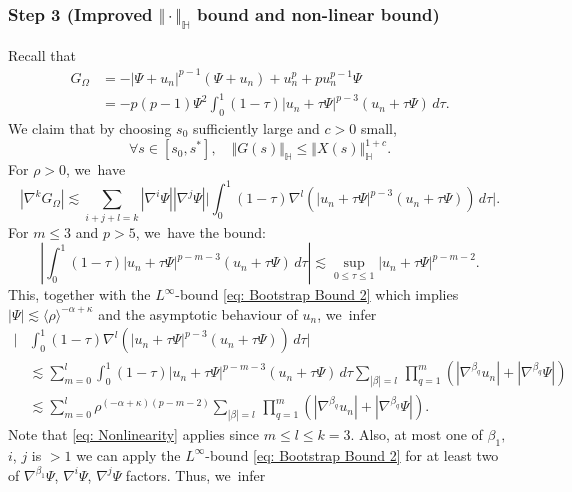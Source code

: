 \documentclass[JEP,XML,SOM,Unicode]{cedram}
\theoremstyle{plain}
\theoremstyle{definition}
\begin{document}
\subsubsection*{Step 3 (Improved $\Vert \cdot\Vert_{\mathbb H}$ bound and non-linear bound)}
Recall that
\begin{equation}
\label{eq: Integral Form of Nonlinearity}
\begin{aligned}
G_\Omega&=-|\Psi+u_n|^{p-1}(\Psi+u_n)+u_n^p+pu_n^{p-1}\Psi\\
&=-p(p-1)\Psi^2\int_0^1(1-\tau)|u_n+\tau\Psi|^{p-3}(u_n+\tau\Psi)\,d\tau.
\end{aligned}
\end{equation}
We claim that by choosing $s_0$ sufficiently large and $c>0$ small,
\begin{equation}
\label{eq: Nonlinear Bound 2}
\forall s\in [s_0,s^*],\quad \Vert G(s)\Vert_{\mathbb H}\le\Vert X(s)\Vert_{\mathbb H}^{1+c}.
\end{equation}
For $\rho>0$, we~have
\begin{equation}
\label{eq: Derivative Nonlinearity}
|\nabla^k G_\Omega|\lesssim \sum_{i+j+l=k}|\nabla^i\Psi||\nabla^j\Psi| \bigg|\int_0^1(1-\tau)\nabla^l\left(|u_n+\tau\Psi|^{p-3}(u_n+\tau\Psi)\right)\,d\tau\bigg|.
\end{equation}
For $m\le 3$ and $p>5$, we~have the bound:
\begin{equation}
\label{eq: Nonlinearity}
\left|\int_0^1(1-\tau)|u_n+\tau\Psi|^{p-m-3}(u_n+\tau\Psi)\,d\tau\right|\lesssim \sup_{0\le\tau\le1}|u_n+\tau\Psi|^{p-m-2}.
\end{equation}
This, together with the $L^\infty$-bound \eqref{eq: Bootstrap Bound 2} which implies $|\Psi|\lesssim \langle\rho\rangle^{-\alpha+\kappa}$ and the asymptotic behaviour of $u_n$, we~infer
\begin{equation}
\label{eq: Nonlinearity Expansion}
\begin{aligned}
\bigg|&\int_0^1(1-\tau)\nabla^l\left(|u_n+\tau\Psi|^{p-3}(u_n+\tau\Psi)\right)\,d\tau\bigg|\\
&\lesssim \sum_{m=0}^l\int_0^1(1-\tau)|u_n+\tau\Psi|^{p-m-3}(u_n+\tau\Psi)\,d\tau\sum_{|\beta|=l}\,\prod_{q=1}^m(|\nabla^{\beta_q}u_n|+|\nabla^{\beta_q}\Psi|)\\
&\lesssim \sum_{m=0}^l\rho^{(-\alpha+\kappa)(p-m-2)}\sum_{|\beta|=l}\,\prod_{q=1}^m(|\nabla^{\beta_q}u_n|+|\nabla^{\beta_q}\Psi|).
\end{aligned}
\end{equation}
Note that \eqref{eq: Nonlinearity} applies since $m\le l\le k=3$. Also, at most one of $\beta_1,$ $i$, $j$ is $>1$ \ie we can apply the $L^\infty$-bound \eqref{eq: Bootstrap Bound 2} for at least two of $\nabla^{\beta_1}\Psi$, $\nabla^i\Psi$, $\nabla^j\Psi$ factors. Thus, we~infer
\end{document}
